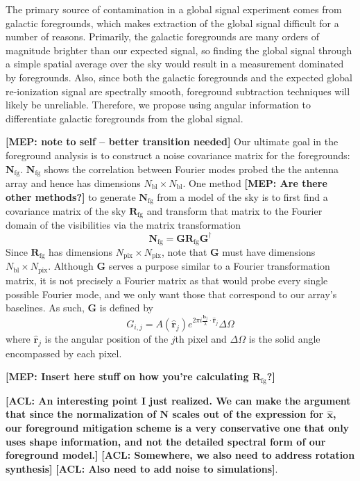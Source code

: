 \documentclass[twolcolumn,apj]{emulateapj}
\newcommand{\Nfg}{\mathbf{N}_{\textrm{fg}}}
\newcommand{\Rfg}{\mathbf{R}_{\textrm{fg}}}
\newcommand{\rhat}{\hat{\mathbf{r}}}
\newcommand{\Nbl}{N_{\textrm{bl}}}
\newcommand{\acl}[1]{{\color{red} \textbf{[ACL:  #1]}}}
\newcommand{\mep}[1]{{\color{applegreen} \textbf{[MEP:  #1]}}}
\begin{document}
The primary source of contamination in a global signal experiment comes from galactic foregrounds, which makes extraction of the global signal difficult for a number of reasons. Primarily, the galactic foregrounds are many orders of magnitude brighter than our expected signal, so finding the global signal through a simple spatial average over the sky would result in a measurement dominated by foregrounds. Also, since both the galactic foregrounds and the expected global re-ionization signal are spectrally smooth, foreground subtraction techniques will likely be unreliable. Therefore, we propose using angular information to differentiate galactic foregrounds from the global signal. 

\mep{note to self -- better transition needed} 
Our ultimate goal in the foreground analysis is to construct a noise covariance matrix for the foregrounds: $\Nfg$. $\Nfg$  shows the correlation between Fourier modes probed the the antenna array and hence has dimensions $\Nbl \times \Nbl$. One method \mep{Are there other methods?} to generate $\Nfg$ from a model of the sky is to first find a covariance matrix of the sky $\Rfg$ and transform that matrix to the Fourier domain of the visibilities via the matrix transformation 
\begin{equation}
\Nfg = \mathbf{G} \Rfg \mathbf{G}^\dagger
\end{equation}
Since $\Rfg$ has dimensions $N_{\textrm{pix}} \times N_{\textrm{pix}}$, note that $\mathbf{G}$ must have dimensions $\Nbl \times N_{\textrm{pix}}$. Although $\mathbf{G}$ serves a purpose similar to a Fourier transformation matrix, it is not precisely a Fourier matrix as that would probe every single possible Fourier mode, and we only want those that correspond to our array's baselines. As such, $\mathbf{G}$ is defined by 
\begin{equation}
G_{i,j} = A(\rhat_j)e^{2\pi i \frac{\mathbf{b_\textit{j}}}{\lambda} \cdot \boldsymbol \rhat_j} \Delta \Omega
\end{equation}
where $\rhat_j$ is the angular position of the $j$th pixel and $\Delta \Omega$ is the solid angle encompassed by each pixel. 

\mep{Insert here stuff on how you're calculating $\Rfg$?}

\acl{An interesting point I just realized.  We can make the argument that since the normalization of $\mathbf{N}$ scales out of the expression for $\hat{\mathbf{x}}$, our foreground mitigation scheme is a very conservative one that only uses shape information, and not the detailed spectral form of our foreground model.}
\acl{Somewhere, we also need to address rotation synthesis}
\acl{Also need to add noise to simulations}.
\end{document}
